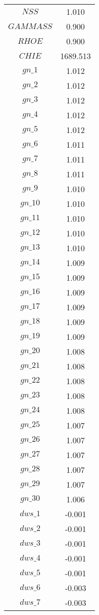 \begin{center}
\begin{longtable}{cc}
$NSS$ 	 & 	 1.010 \\
$GAMMASS$ 	 & 	 0.900 \\
$RHOE$ 	 & 	 0.900 \\
$CHIE$ 	 & 	 1689.513 \\
$gn\_1$ 	 & 	 1.012 \\
$gn\_2$ 	 & 	 1.012 \\
$gn\_3$ 	 & 	 1.012 \\
$gn\_4$ 	 & 	 1.012 \\
$gn\_5$ 	 & 	 1.012 \\
$gn\_6$ 	 & 	 1.011 \\
$gn\_7$ 	 & 	 1.011 \\
$gn\_8$ 	 & 	 1.011 \\
$gn\_9$ 	 & 	 1.010 \\
$gn\_10$ 	 & 	 1.010 \\
$gn\_11$ 	 & 	 1.010 \\
$gn\_12$ 	 & 	 1.010 \\
$gn\_13$ 	 & 	 1.010 \\
$gn\_14$ 	 & 	 1.009 \\
$gn\_15$ 	 & 	 1.009 \\
$gn\_16$ 	 & 	 1.009 \\
$gn\_17$ 	 & 	 1.009 \\
$gn\_18$ 	 & 	 1.009 \\
$gn\_19$ 	 & 	 1.009 \\
$gn\_20$ 	 & 	 1.008 \\
$gn\_21$ 	 & 	 1.008 \\
$gn\_22$ 	 & 	 1.008 \\
$gn\_23$ 	 & 	 1.008 \\
$gn\_24$ 	 & 	 1.008 \\
$gn\_25$ 	 & 	 1.007 \\
$gn\_26$ 	 & 	 1.007 \\
$gn\_27$ 	 & 	 1.007 \\
$gn\_28$ 	 & 	 1.007 \\
$gn\_29$ 	 & 	 1.007 \\
$gn\_30$ 	 & 	 1.006 \\
$dws\_1$ 	 & 	 -0.001 \\
$dws\_2$ 	 & 	 -0.001 \\
$dws\_3$ 	 & 	 -0.001 \\
$dws\_4$ 	 & 	 -0.001 \\
$dws\_5$ 	 & 	 -0.001 \\
$dws\_6$ 	 & 	 -0.003 \\
$dws\_7$ 	 & 	 -0.003 \\

\end{longtable}
\end{center}
